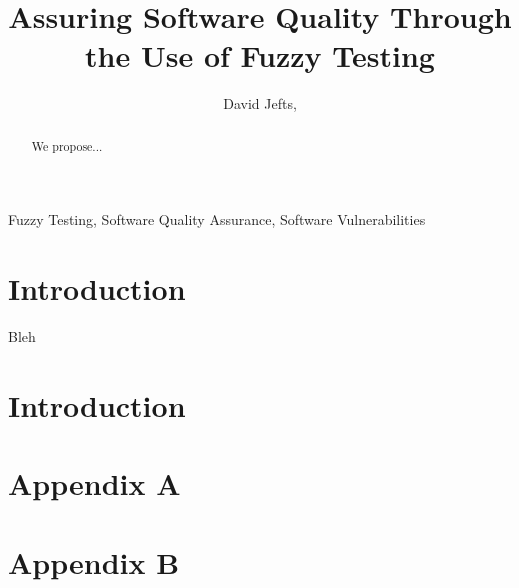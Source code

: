 \documentclass[10pt, compsoc]{IEEEtran}
\begin{document}
\title{Assuring Software Quality Through the Use of Fuzzy Testing}
\author{David Jefts, }

\maketitle


\begin{abstract}
	We propose...
\end{abstract}

\begin{IEEEkeywords}
	Fuzzy Testing, Software Quality Assurance, Software Vulnerabilities
\end{IEEEkeywords}

\section{Introduction}
	Bleh

\section{Introduction}

\pagebreak
	
\appendix
	\section{Appendix A}
	
	\section{Appendix B}
	
\newpage
\nocite{*}


\end{document}
